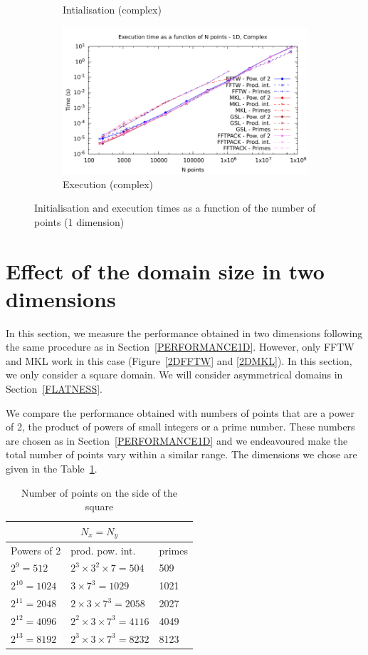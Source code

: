 \documentclass[12pt, a4paper]{article}
\begin{document}
\begin{figure}[H]
\begin{subfigure}{.5\textwidth}
\caption{Intialisation (complex)}
\label{1DCI}
\end{subfigure}%
\begin{subfigure}{.5\textwidth}
\centering
\includegraphics[width=.9\linewidth]{graphs/1d-exec-c.pdf}
\caption{Execution (complex)}
\label{1DC}
\end{subfigure}
\caption{Initialisation and execution times as a function of the number of points (1 dimension)}
\label{1D}
\end{figure}

\section{Effect of the domain size in two dimensions}\label{PERFORMANCE2D}

In this section, we measure the performance obtained in two dimensions following the same procedure 
as in Section~\ref{PERFORMANCE1D}. However, only FFTW and MKL work in this case (Figure~\ref{2DFFTW} 
and \ref{2DMKL}). In this section, we only consider a square domain. We will consider asymmetrical 
domains in Section~\ref{FLATNESS}. 

We compare the performance obtained with numbers of points that are a power of 2, the product of 
powers of small integers or a prime number. These numbers are chosen as in 
Section~\ref{PERFORMANCE1D} and we endeavoured make the total number of points vary within a 
similar range. The dimensions we chose are given in the Table~\ref{SIZES2D}.

\begin{table}[H]
\captionsetup{width=0.8\linewidth}
\centering
\begin{tabular}{|l|l|l|}
  \hline
  \multicolumn{3}{|c|}{$N_x=N_y$}\\
  \hline
  \hline
Powers of 2 & prod. pow. int. & primes\\ \hline
$2^9=512$ & $2^3\times 3^2\times 7=504$ & 509\\ \hline
$2^{10}=1024$ & $3\times 7^3=1029$ & 1021\\ \hline
$2^{11}=2048$ & $2\times 3\times 7^3=2058$ & 2027\\ \hline
$2^{12}=4096$ & $2^2\times 3\times 7^3=4116$ & 4049\\ \hline
$2^{13}=8192$ & $2^3\times 3\times 7^3=8232$ & 8123\\ \hline
\end{tabular}
\caption{Number of points on the side of the square}\label{SIZES2D}
\end{table}
\end{document}
